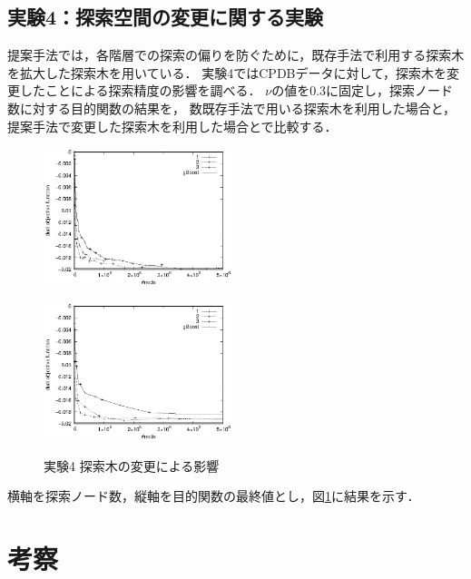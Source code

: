\section{実験4：探索空間の変更に関する実験}
提案手法では，各階層での探索の偏りを防ぐために，既存手法で利用する探索木を拡大した探索木を用いている．
実験4ではCPDBデータに対して，探索木を変更したことによる探索精度の影響を調べる．
$\nu$の値を0.3に固定し，探索ノード数に対する目的関数の結果を，
数既存手法で用いる探索木を利用した場合と，提案手法で変更した探索木を利用した場合とで比較する．
\begin{figure}[t]
	\begin{minipage}{0.5\hsize}
		\begin{center}
			\includegraphics[width=55mm]{cpdb/purpose_node_3_tree.eps}
		\end{center}
		\vspace{0.5cm}
		\label{fig:14}
	\end{minipage}
	\begin{minipage}{0.5\hsize}
		\begin{center}
			\includegraphics[width=55mm]{cpdb/purpose_node_3.eps}
		\end{center}
		\vspace{0.5cm}
		\label{fig:15}
	\end{minipage}
	\caption{実験4 探索木の変更による影響}
	\label{tree}
\end{figure}
横軸を探索ノード数，縦軸を目的関数の最終値とし，図\ref{tree}に結果を示す．

\chapter{考察}
\label{考察}
